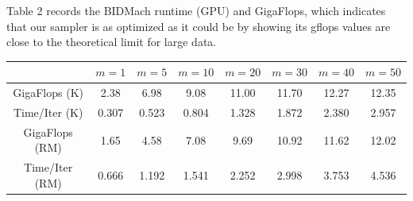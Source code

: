 \documentclass[a0paper,portrait]{baposter}
\begin{document}
\begin{poster}
{Table 2 records the BIDMach runtime (GPU) and GigaFlops, which indicates that our sampler is as optimized as it could be by showing its gflops values are close to the theoretical limit for large data. 

\begin{center}
\begin{tabular}{ |c|c|c|c|c|c|c|c| } 
\hline
               & $m=1$ & $m=5$ & $m=10$ & $m=20$ & $m=30$ & $m=40$ & $m=50$  \\
\hline \hline
GigaFlops (K)  & 2.38  & 6.98  & 9.08   & 11.00  & 11.70  & 12.27  & 12.35   \\ 
Time/Iter (K)  & 0.307 & 0.523 & 0.804  & 1.328  & 1.872  & 2.380  & 2.957   \\
\hline 
GigaFlops (RM) & 1.65  & 4.58  & 7.08   & 9.69   & 10.92  & 11.62  & 12.02   \\ 
Time/Iter (RM) & 0.666 & 1.192 & 1.541  & 2.252  & 2.998  & 3.753  & 4.536   \\
\hline
\end{tabular}
\end{center}

}


\end{poster}
\end{document}
